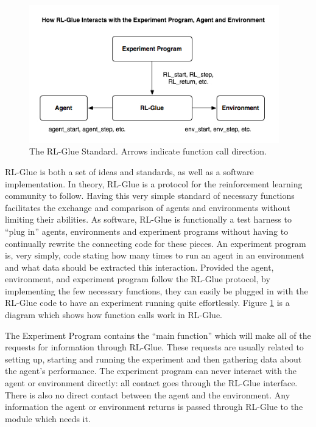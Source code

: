 \documentclass[11pt]{article}
\begin{document}
\begin{figure}
	\begin{centering}
\includegraphics[height=60mm]{images/glue_connections_no_shadow.png}
\caption{The RL-Glue Standard. Arrows indicate function call direction.}
\label{fig:glue-connections}
\end{centering}
\end{figure}

RL-Glue is both a set of ideas and standards, as well as a software implementation. In theory, RL-Glue is a protocol for the reinforcement learning community to follow. Having this very simple standard of necessary functions facilitates the exchange and comparison of agents and environments without limiting their abilities. As software, RL-Glue is functionally a test harness to ``plug in'' agents, environments and experiment programs without having to continually rewrite the connecting code for these pieces. An experiment program is, very simply, code stating how many times to run an agent in an environment and what data should be extracted this interaction. Provided the agent, environment, and experiment program follow the RL-Glue protocol, by implementing the few necessary functions, they can easily be plugged in with the RL-Glue code to have an experiment running quite effortlessly. Figure \ref{fig:glue-connections} is a diagram which shows how function calls work in RL-Glue.



The Experiment Program contains the ``main function'' which will make all of the requests for information through RL-Glue. These requests are usually related to setting up, starting and running the experiment and then gathering data about the agent's performance. The experiment program can never interact with the agent or environment directly: all contact goes through the RL-Glue interface.  There is also no direct contact between the agent and the environment. Any information the agent or environment returns is passed through RL-Glue to the module which needs it.  
\end{document}
